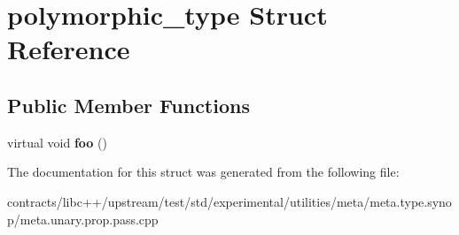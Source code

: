 \hypertarget{structpolymorphic__type}{}\section{polymorphic\+\_\+type Struct Reference}
\label{structpolymorphic__type}
\subsection*{Public Member Functions}
\begin{DoxyCompactItemize}
\item 
\mbox{\label{structpolymorphic__type_ae98a4ac1ef45245cb5a904ae065d519e}} 
virtual void {\bfseries foo} ()
\end{DoxyCompactItemize}


The documentation for this struct was generated from the following file\+:\begin{DoxyCompactItemize}
\item 
contracts/libc++/upstream/test/std/experimental/utilities/meta/meta.\+type.\+synop/meta.\+unary.\+prop.\+pass.\+cpp\end{DoxyCompactItemize}
